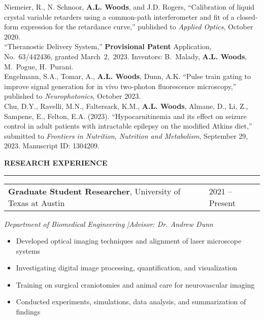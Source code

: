 \documentclass[12pt]{article}
\makeatletter
\newcommand{\sectionheading}[1]{%
    \vspace{1.2ex}%
    {\large\bfseries\MakeUppercase{#1}}\par\vspace{0.3ex}%
    {\color[gray]{0.6}\rule{0.98\linewidth}{0.3pt}}\vspace{0.6ex}%
  }
\newcommand{\sectionheading}[1]{%
    \vspace{1.2ex}%
    {\large\bfseries{\SansHead \MakeUppercase{#1}}}\par\vspace{0.3ex}%
    {\color[gray]{0.6}\rule{0.98\linewidth}{0.3pt}}\vspace{0.6ex}%
  }
\newcommand{\jobtitle}[1]{\textbf{#1}} %
\newcommand{\institution}[1]{#1} %
\newcommand{\dateinfo}[1]{\textit{#1}} %
\newcommand{\authorname}[1]{\textbf{#1}} %
\newcommand{\journalname}[1]{\textit{#1}} %
\newcommand{\specialterm}[1]{\textbf{#1}} %
\newcommand{\citationtext}[1]{\small #1} %
\newcommand{\contactsep}{\;|\;} %
\newcommand{\daterange}[2]{#1 -- #2} %
\newenvironment{contenttabular}[1]{%
  \begin{tabular*}{\textwidth}{@{}p{0.77\textwidth} p{0.22\textwidth}@{}}%
}{%
  \end{tabular*}%
}
\newcommand{\contentvspace}{\vspace{0.6ex}} %
\newcommand{\publicationvspace}{\vspace{0.8ex}} %
\makeatother
\begin{document}
{\citationtext{
Niemeier, R., N. Schnoor, \authorname{A.L. Woods}, and J.D. Rogers, ``Calibration of liquid crystal variable retarders using a common-path interferometer and fit of a closed-form expression for the retardance curve,'' published to \journalname{Applied Optics}, October 2020.\\[\publicationvspace]
``Theranostic Delivery System,'' \specialterm{Provisional Patent} Application, No.~63/442436, granted March~2,~2023. Inventors: B.~Malady, \authorname{A.L. Woods}, M.~Pogue, H.~Purani.\\[\publicationvspace]
Engelmann, S.A., Tomar, A., \authorname{A.L. Woods}, Dunn, A.K. ``Pulse train gating to improve signal generation for in vivo two-photon fluorescence microscopy,'' published to \journalname{Neurophotonics}, October 2023.\\[\publicationvspace]
Chu, D.Y., Ravelli, M.N., Faltersack, K.M., \authorname{A.L. Woods}, Almane, D., Li, Z., Sampene, E., Felton, E.A. (2023). ``Hypocarnitinemia and its effect on seizure control in adult patients with intractable epilepsy on the modified Atkins diet,'' submitted to \journalname{Frontiers in Nutrition, Nutrition and Metabolism}, September 29, 2023. Manuscript ID: 1304209.
}}


\sectionheading{Research Experience}

\noindent\begin{contenttabular}{\textwidth}\jobtitle{Graduate Student Researcher}, \institution{University of Texas at Austin} & \daterange{2021}{Present}\\\end{contenttabular}
\contentvspace
\dateinfo{Department of Biomedical Engineering \contactsep Advisor: Dr. Andrew Dunn}
\begin{itemize}
  \item Developed optical imaging techniques and alignment of laser microscope systems
  \item Investigating digital image processing, quantification, and visualization
  \item Training on surgical craniotomies and animal care for neurovascular imaging
  \item Conducted experiments, simulations, data analysis, and summarization of findings
\end{itemize}
\end{document}
